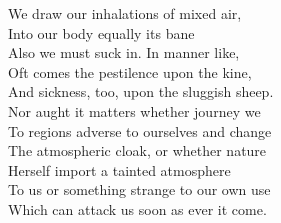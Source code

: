We draw our inhalations of mixed air,\\
Into our body equally its bane\\
Also we must suck in. In manner like,\\
Oft comes the pestilence upon the kine,\\
And sickness, too, upon the sluggish sheep.\\
Nor aught it matters whether journey we\\
To regions adverse to ourselves and change\\
The atmospheric cloak, or whether nature\\
Herself import a tainted atmosphere\\
To us or something strange to our own use\\
Which can attack us soon as ever it come.


